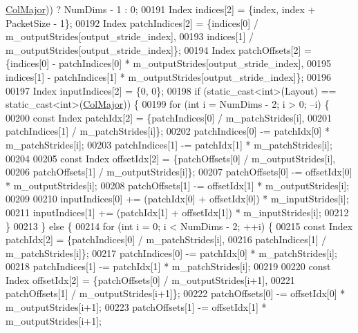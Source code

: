\begin{DoxyCode}
      \hyperlink{group__enums_ggaacded1a18ae58b0f554751f6cdf9eb13a0cbd4bdd0abcfc0224c5fcb5e4f6669a}{ColMajor})) ? NumDims - 1 : 0;
00191     Index indices[2] = \{index, index + PacketSize - 1\};
00192     Index patchIndices[2] = \{indices[0] / m\_outputStrides[output\_stride\_index],
00193                              indices[1] / m\_outputStrides[output\_stride\_index]\};
00194     Index patchOffsets[2] = \{indices[0] - patchIndices[0] * m\_outputStrides[output\_stride\_index],
00195                              indices[1] - patchIndices[1] * m\_outputStrides[output\_stride\_index]\};
00196 
00197     Index inputIndices[2] = \{0, 0\};
00198     \textcolor{keywordflow}{if} (static\_cast<int>(Layout) == \textcolor{keyword}{static\_cast<}\textcolor{keywordtype}{int}\textcolor{keyword}{>}(\hyperlink{group__enums_ggaacded1a18ae58b0f554751f6cdf9eb13a0cbd4bdd0abcfc0224c5fcb5e4f6669a}{ColMajor})) \{
00199       \textcolor{keywordflow}{for} (\textcolor{keywordtype}{int} i = NumDims - 2; i > 0; --i) \{
00200         \textcolor{keyword}{const} Index patchIdx[2] = \{patchIndices[0] / m\_patchStrides[i],
00201                                    patchIndices[1] / m\_patchStrides[i]\};
00202         patchIndices[0] -= patchIdx[0] * m\_patchStrides[i];
00203         patchIndices[1] -= patchIdx[1] * m\_patchStrides[i];
00204 
00205         \textcolor{keyword}{const} Index offsetIdx[2] = \{patchOffsets[0] / m\_outputStrides[i],
00206                                     patchOffsets[1] / m\_outputStrides[i]\};
00207         patchOffsets[0] -= offsetIdx[0] * m\_outputStrides[i];
00208         patchOffsets[1] -= offsetIdx[1] * m\_outputStrides[i];
00209 
00210         inputIndices[0] += (patchIdx[0] + offsetIdx[0]) * m\_inputStrides[i];
00211         inputIndices[1] += (patchIdx[1] + offsetIdx[1]) * m\_inputStrides[i];
00212       \}
00213     \} \textcolor{keywordflow}{else} \{
00214       \textcolor{keywordflow}{for} (\textcolor{keywordtype}{int} i = 0; i < NumDims - 2; ++i) \{
00215         \textcolor{keyword}{const} Index patchIdx[2] = \{patchIndices[0] / m\_patchStrides[i],
00216                                    patchIndices[1] / m\_patchStrides[i]\};
00217         patchIndices[0] -= patchIdx[0] * m\_patchStrides[i];
00218         patchIndices[1] -= patchIdx[1] * m\_patchStrides[i];
00219 
00220         \textcolor{keyword}{const} Index offsetIdx[2] = \{patchOffsets[0] / m\_outputStrides[i+1],
00221                                     patchOffsets[1] / m\_outputStrides[i+1]\};
00222         patchOffsets[0] -= offsetIdx[0] * m\_outputStrides[i+1];
00223         patchOffsets[1] -= offsetIdx[1] * m\_outputStrides[i+1];

\end{DoxyCode}
